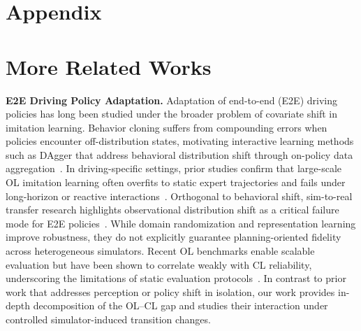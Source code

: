\documentclass{article}
\begin{document}
\clearpage


\newpage
\appendix

\section*{Appendix}
\section{More Related Works}
\label{appendix:more_related_works}
\textbf{E2E Driving Policy Adaptation.} Adaptation of end-to-end (E2E) driving policies has long been studied under the broader problem of covariate shift in imitation learning. Behavior cloning suffers from compounding errors when policies encounter off-distribution states, motivating interactive learning methods such as DAgger that address behavioral distribution shift through on-policy data aggregation~\cite{ross2011dagger, ross2014reinforcement}. In driving-specific settings, prior studies confirm that large-scale OL imitation learning often overfits to static expert trajectories and fails under long-horizon or reactive interactions~\cite{codevilla2019exploring,zheng2024datascalinglaw}.
Orthogonal to behavioral shift, sim-to-real transfer research highlights observational distribution shift as a critical failure mode for E2E policies~\cite{dosovitskiy2017carla}. While domain randomization and representation learning improve robustness, they do not explicitly guarantee planning-oriented fidelity across heterogeneous simulators. Recent OL benchmarks enable scalable evaluation but have been shown to correlate weakly with CL reliability, underscoring the limitations of static evaluation protocols~\cite{navsimv1, navsimv2}. In contrast to prior work that addresses perception or policy shift in isolation, our work provides in-depth decomposition of the OL–CL gap and studies their interaction under controlled simulator-induced transition changes.
\end{document}
